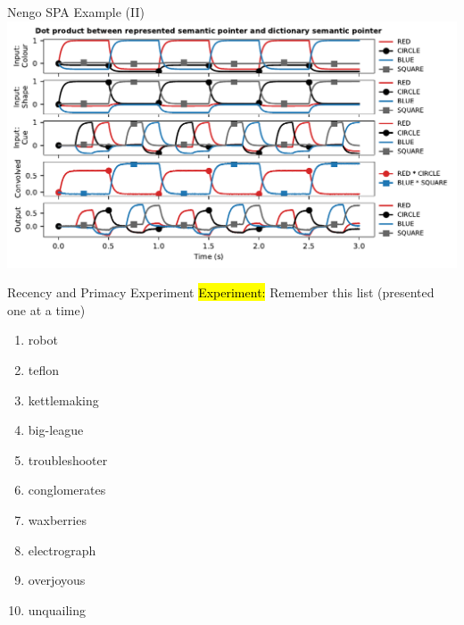 \documentclass[handout,aspectratio=169]{beamer}
\begin{document}
	\begin{frame}{Nengo SPA Example (II)}
		\centering
		\includegraphics[width=\textwidth]{media/nengo_spa_example.pdf}
	\end{frame}

	\begin{frame}{Recency and Primacy Experiment}
		\centering
		\Large
		\hl{Experiment:} Remember this list (presented one at a time)
		\begin{multicols}{2}
		\begin{enumerate}
			\centering
			\setlength{\itemsep}{0.25cm}
			\item robot
			\item teflon
			\item kettlemaking
			\item big-league
			\item troubleshooter
			\item conglomerates
			\item waxberries
			\item electrograph
			\item overjoyous
			\item unquailing
		\end{enumerate}
		\end{multicols}
	\end{frame}
\end{document}
